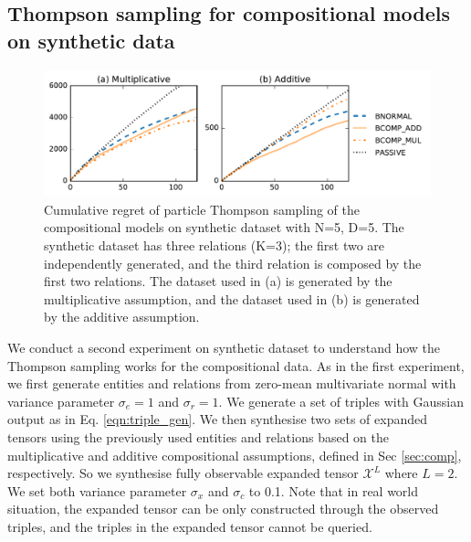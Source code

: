 \subsection{Thompson sampling for compositional models on synthetic data}
\begin{figure}[t]
	\centering
	\includegraphics[width=\linewidth]{images/toy_comp_5_2_5.pdf}
	\caption{\label{fig:comp_synthetic} Cumulative regret of particle Thompson sampling of the compositional models on synthetic dataset with N=5, D=5. The synthetic dataset has three relations (K=3); the first two are independently generated, and the third relation is composed by the first two relations. The dataset used in (a) is generated by the multiplicative assumption, and the dataset used in (b) is generated by the additive assumption.}
\end{figure}

We conduct a second experiment on synthetic dataset to understand how
the Thompson sampling works for the compositional data. 
As in the first experiment, we first generate entities and relations from 
zero-mean multivariate normal with variance parameter $\sigma_e = 1$ and 
$\sigma_r=1$. We generate a set of triples with Gaussian output as in 
Eq. \ref{eqn:triple_gen}. We then synthesise two sets of expanded tensors 
using the previously used entities and relations based on the multiplicative 
and additive compositional assumptions, defined in Sec \ref{sec:comp}, 
respectively. So we synthesise fully observable expanded tensor $\mathcal{X}^L$ 
where $L=2$. We set both variance parameter $\sigma_x$ and $\sigma_c$ to 0.1. Note that in real world situation, the expanded tensor can be only constructed through the observed triples, and the triples in the expanded tensor cannot be queried.

